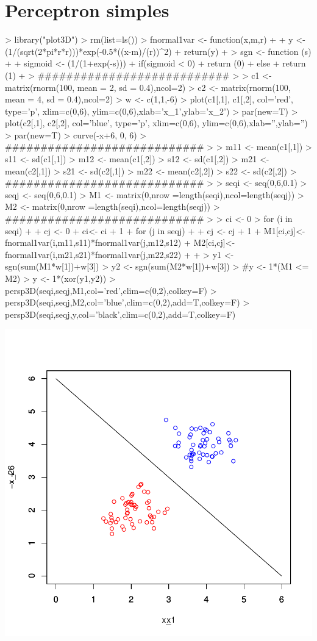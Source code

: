 \documentclass{article}
\begin{document}


\section{Perceptron simples}


\begin{Schunk}
\begin{Sinput}
> library("plot3D")
> rm(list=ls())
> fnormal1var <- function(x,m,r)
+ {
+   y <- (1/(sqrt(2*pi*r*r)))*exp(-0.5*((x-m)/(r))^2)
+   return(y)
+ }
> sgn <- function (s)
+ {
+   sigmoid <- (1/(1+exp(-s)))
+   if(sigmoid < 0)
+     return (0)
+   else
+     return (1)
+ }
> ###########################
> 
> c1 <- matrix(rnorm(100, mean = 2, sd = 0.4),ncol=2)
> c2 <- matrix(rnorm(100, mean = 4, sd = 0.4),ncol=2)
> w <- c(1,1,-6)
> plot(c1[,1], c1[,2], col='red', type='p', xlim=c(0,6), ylim=c(0,6),xlab='x_1',ylab='x_2')
> par(new=T)
> plot(c2[,1], c2[,2], col='blue', type='p', xlim=c(0,6), ylim=c(0,6),xlab='',ylab='')
> par(new=T)
> curve(-x+6, 0, 6)
> ############################
> 
> m11 <- mean(c1[,1])
> s11 <- sd(c1[,1])
> m12 <- mean(c1[,2])
> s12 <- sd(c1[,2])
> m21 <- mean(c2[,1])
> s21 <- sd(c2[,1])
> m22 <- mean(c2[,2])
> s22 <- sd(c2[,2])
> ############################
> 
> seqi <- seq(0,6,0.1)
> seqj <- seq(0,6,0.1)
> M1 <- matrix(0,nrow =length(seqi),ncol=length(seqj))
> M2 <- matrix(0,nrow =length(seqi),ncol=length(seqj))
> ############################
> 
> ci <- 0
> for (i in seqi)
+ {
+   cj <- 0
+   ci<- ci + 1
+   for (j in seqj)
+   {
+     cj <- cj + 1
+     M1[ci,cj]<-fnormal1var(i,m11,s11)*fnormal1var(j,m12,s12)
+     M2[ci,cj]<-fnormal1var(i,m21,s21)*fnormal1var(j,m22,s22)
+   }
+ }
> y1 <- sgn(sum(M1*w[1])+w[3])
> y2 <- sgn(sum(M2*w[1])+w[3])
> #y <- 1*(M1 <= M2)
> y <- 1*(xor(y1,y2))
> persp3D(seqi,seqj,M1,col='red',clim=c(0,2),colkey=F)
> persp3D(seqi,seqj,M2,col='blue',clim=c(0,2),add=T,colkey=F)
> persp3D(seqi,seqj,y,col='black',clim=c(0,2),add=T,colkey=F)
\end{Sinput}
\end{Schunk}
\includegraphics{aula3-001}
\end{document}
